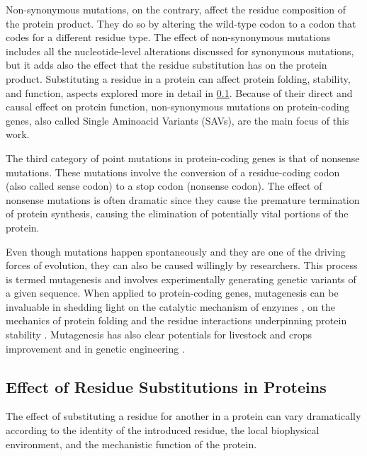 Non-synonymous mutations, on the contrary, affect the residue composition of the protein product.
They do so by altering the wild-type codon to a codon that codes for a different residue type.
The effect of non-synonymous mutations includes all the nucleotide-level alterations discussed for synonymous mutations, but it adds also the effect that the residue substitution has on the protein product.
Substituting a residue in a protein can affect protein folding, stability, and function, aspects explored more in detail in \cref{sec:SAV}.
Because of their direct and causal effect on protein function, non-synonymous mutations on protein-coding genes, also called Single Aminoacid Variants (SAVs), are the main focus of this work.

The third category of point mutations in protein-coding genes is that of nonsense mutations.
These mutations involve the conversion of a residue-coding codon (also called sense codon) to a stop codon (nonsense codon).
The effect of nonsense mutations is often dramatic since they cause the premature termination of protein synthesis, causing the elimination of potentially vital portions of the protein.

Even though mutations happen spontaneously and they are one of the driving forces of evolution, they can also be caused willingly by researchers.
This process is termed mutagenesis and involves experimentally generating genetic variants of a given sequence.
When applied to protein-coding genes, mutagenesis can be invaluable in shedding light on the catalytic mechanism of enzymes \parencite{Peracchi2001}, on the mechanics of protein folding and the residue interactions underpinning protein stability \parencite{Nisthal2019}.
Mutagenesis has also clear potentials for livestock and crops improvement and in genetic engineering \parencite{Davies1988, Holme2019, Kalds2019}.

\subsection{Effect of Residue Substitutions in Proteins}\label{sec:SAV}

The effect of substituting a residue for another in a protein can vary dramatically according to the identity of the introduced residue, the local biophysical environment, and the mechanistic function of the protein.

